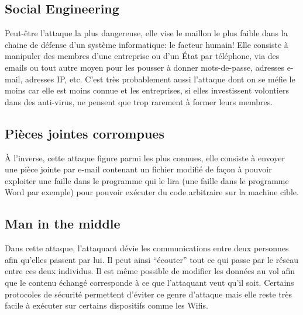 \documentclass[article]{yReport}
\begin{document}
	\newpage
	\subsection{Social Engineering}
	Peut-être l'attaque la plus dangereuse, elle vise le maillon le plus faible dans la chaine de défense d'un système informatique: le facteur humain! Elle consiste à manipuler des membres d'une entreprise ou d'un État par téléphone, via des emails ou tout autre moyen pour les pousser à donner mots-de-passe, adresses e-mail, adresses IP, etc.
	C'est très probablement aussi l'attaque dont on se méfie le moins car elle est moins connue et les entreprises, si elles investissent volontiers dans des anti-virus, ne pensent que trop rarement à former leurs membres.
	
	\subsection{Pièces jointes corrompues}
	À l'inverse, cette attaque figure parmi les plus connues, elle consiste à envoyer une pièce jointe par e-mail contenant un fichier modifié de façon à pouvoir exploiter une faille dans le programme qui le lira (une faille dans le programme Word par exemple) pour pouvoir exécuter du code arbitraire sur la machine cible.
	
	\subsection{Man in the middle}
	Dans cette attaque, l'attaquant dévie les communications entre deux personnes afin qu'elles passent par lui.
	Il peut ainsi \enquote{écouter} tout ce qui passe par le réseau entre ces deux individus.
	Il est même possible de modifier les données au vol afin que le contenu échangé corresponde à ce que l'attaquant veut qu'il soit.
	Certains protocoles de sécurité permettent d'éviter ce genre d'attaque mais elle reste très facile à exécuter sur certains dispositifs comme les Wifis.
	
\end{document}
